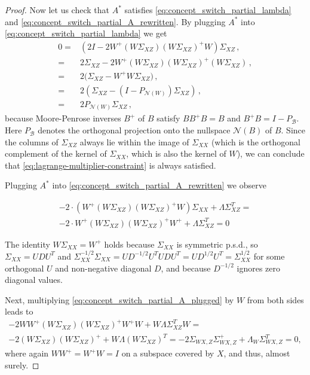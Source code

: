 \begin{proof}
Now let us check that $A^*$ satisfies \ref{eq:concept_switch_partial_lambda} and \ref{eq:concept_switch_partial_A_rewritten}. By plugging $A^*$ into \ref{eq:concept_switch_partial_lambda} we get
\begin{align}
    0 {} = {} &(2I - 2 W^+(W\Sigma_{XZ})(W \Sigma_{XZ})^+W) \Sigma_{XZ} \, ,\nonumber\\ 
    {} = {} &2 \Sigma_{XZ} - 2 W^+ (W\Sigma_{XZ}) (W\Sigma_{XZ})^+ (W\Sigma_{XZ}) \, , \nonumber\\
    {} = {} &2 \Big( \Sigma_{XZ} - W^+W\Sigma_{XZ} \Big) \, , \nonumber\\
    {} = {} &2 \left( \Sigma_{XZ} - \left(I - P_{\mathcal{N}(W)}\right) \Sigma_{XZ} \right) \, ,\nonumber \\
    {} = {} &2 P_{\mathcal{N}(W)} \Sigma_{XZ} \, ,\label{eq:lagrange-multiplier-constraint}
\end{align}
because Moore-Penrose inverses $B^+$ of $B$ satisfy $B B^+ B = B$ and $B^+ B = I - P_{\mathcal{B}}$. Here $P_{\mathcal{B}}$ denotes the orthogonal projection onto the nullspace $\mathcal{N}(B)$ of $B$. Since the columns of $\Sigma_{XZ}$ always lie within the image of $\Sigma_{XX}$ (which is the orthogonal complement of the kernel of $\Sigma_{XX}$, which is also the kernel of $W$), we can conclude that \eqref{eq:lagrange-multiplier-constraint} is always satisfied.

Plugging $A^*$ into \ref{eq:concept_switch_partial_A_rewritten} we observe

\begin{multline}
    \label{eq:concept_switch_partial_A_plugged}
    -2 \cdot ( W^+(W \Sigma_{XZ}) (W \Sigma_{XZ})^+ W) \Sigma_{XX} + \Lambda \Sigma_{XZ}^T = \\
    -2 \cdot W^+ (W \Sigma_{XZ}) (W \Sigma_{XZ})^+ W^+ + \Lambda \Sigma_{XZ}^T = 0
\end{multline}

The identity $W \Sigma_{XX} = W^+$ holds because $\Sigma_{XX}$ is symmetric p.s.d., so $\Sigma_{XX} = U D U^T$ and $\Sigma_{XX}^{-1/2} \Sigma_{XX} = U D^{-1/2} U^T U D U^T = UD^{1/2}U^T = \Sigma_{XX}^{1/2}$ for some orthogonal $U$ and non-negative diagonal $D$, and because $D^{-1/2}$ ignores zero diagonal values.

Next, multiplying \eqref{eq:concept_switch_partial_A_plugged} by $W$ from both sides leads to
\begin{multline}
    -2 WW^+ (W\Sigma_{XZ})(W\Sigma_{XZ})^+W^+W + W\Lambda\Sigma_{XZ}^TW = \\
    -2 (W\Sigma_{XZ})(W\Sigma_{XZ})^+ + W\Lambda (W \Sigma_{XZ})^T = -2 \Sigma_{WX, Z} \Sigma_{WX, Z}^+ + \Lambda_W \Sigma_{WX, Z}^T = 0 ,
    \tag{almost surely}
\end{multline}
where again $WW^+ = W^+W = I$ on a subspace covered by $X$, and thus, almost surely.


\end{proof}
